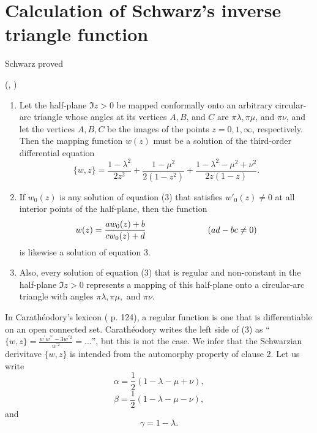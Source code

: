 \documentclass{article}
\begin{document}
\section{Calculation of Schwarz's inverse 
triangle function}
Schwarz
proved 
\begin{theorem}
 (\cite{caratheodory2}, )
\begin{enumerate}
\item
Let the half-plane $\Im z > 0$ be mapped
conformally onto an arbitrary 
circular-arc triangle
whose angles at its vertices $A, B$, and $C$ 
are $\pi \lambda, \pi \mu$, and $\pi \nu$, and
let the vertices $A, B, C$ be the images of
the  points $z = 0, 1, \infty$, respectively.
Then the mapping function $w(z)$ must be 
a solution of the third-order differential
equation
\begin{equation}
\{w,z\} =
\frac{1-\lambda^2}{2 z^2} +
\frac{1-\mu^2}{2(1-z^2)} +
\frac{1-\lambda^2-\mu^2+\nu^2}
{2z(1-z)}.
\end{equation}
\item
If $w_0(z)$ is any solution
of equation (3) that satisfies
$w'_0(z) \neq 0$ at all interior points
of the half-plane, then the function
$$
w(z) = \frac {aw_0(z) + b}{cw_0(z) + d}
\hskip 1in (ad - bc \neq 0)
$$
is likewise a solution of equation 3.
\item
Also, every solution of equation (3) that is regular
and non-constant in the half-plane $\Im z > 0$
represents a mapping of this half-plane onto a
circular-arc triangle with angles $\pi \lambda,
\pi \mu,$ and $\pi \nu$.
\end{enumerate}
\end{theorem}
\noindent
In Carath{\'e}odory's lexicon
(\cite{caratheodory1} p. 124),
a regular function is one that is
differentiable 
on an open connected set.
Carath{\'e}odory writes the left side
of (3) as 
``$\{w,z\} = \frac{w^{'}w^{'''} - 
3 w^{''2}}{w^{'2}} = ...$'', 
but this is not the case.
We infer that the Schwarzian derivitave $\{w,z\}$ 
is intended
from the automorphy property of clause 2.
\newline \newline \noindent
Let us write
\begin{equation}
\alpha = \frac 12
(1 - \lambda - \mu + \nu),
\end{equation}
\begin{equation}
\beta = \frac 12(1-\lambda - \mu - \nu),
\end{equation}
and
\begin{equation}
\gamma = 1 - \lambda.
\end{equation}
\end{document}

